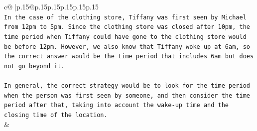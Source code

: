 \documentclass{article}
\begin{document}
{\begin{supertabular}{c@{$\;$}|p{.15\linewidth}@{}p{.15\linewidth}p{.15\linewidth}p{.15\linewidth}p{.15\linewidth}p{.15\linewidth}}
{{{\\ 
\texttt{In the case of the clothing store, Tiffany was first seen by Michael from 12pm to 5pm. Since the clothing store was closed after 10pm, the time period when Tiffany could have gone to the clothing store would be before 12pm. However, we also know that Tiffany woke up at 6am, so the correct answer would be the time period that includes 6am but does not go beyond it.} \\
\\ 
\texttt{In general, the correct strategy would be to look for the time period when the person was first seen by someone, and then consider the time period after that, taking into account the wake{-}up time and the closing time of the location.} \\
            }
        }
    }
    & \\ \\

\end{supertabular}
}
\end{document}
